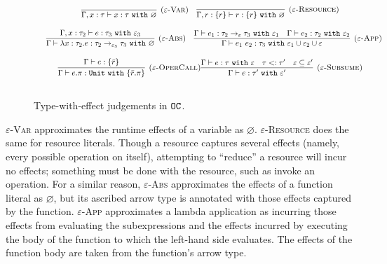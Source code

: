 \begin{figure}[h]

\noindent
{}

\[
\begin{array}{c}

\infer[\textsc{($\varepsilon$-Var)}]
	{ \Gamma, x:\tau \vdash x: \tau~\kw{with} \varnothing }
	{}
	
	~~~
	
\infer[\textsc{($\varepsilon$-Resource)}]
 	{ \Gamma, r: \{ r \} \vdash r : \{ r \}~\kw{with} \varnothing }
 	{} \\[3ex]
 	
 	~~~
	\infer[\textsc{($\varepsilon$-Abs)}]
	{ \Gamma \vdash \lambda x:\tau_2 . e : \tau_2 \rightarrow_{\varepsilon_3} \tau_3~\kw{with} \varnothing }
	{ \Gamma, x: \tau_2 \vdash e: \tau_3~\kw{with} \varepsilon_3 }
	
	~~~
	
\infer[\textsc{($\varepsilon$-App)}]
	{ \Gamma \vdash e_1~e_2 : \tau_3~\kw{with} \varepsilon_1 \cup \varepsilon_2 \cup \varepsilon  }
	{ \Gamma \vdash e_1: \tau_2 \rightarrow_{\varepsilon} \tau_3~\kw{with} \varepsilon_1 & \Gamma \vdash e_2: \tau_2~\kw{with} \varepsilon_2 } \\[3ex]
	
\infer[\textsc{($\varepsilon$-OperCall)}]
	{ \Gamma \vdash e.\pi: \kw{Unit} \kw{with} \{ \bar r.\pi \} }
	{ \Gamma \vdash e: \{ \bar r \}}

\infer[\textsc{($\varepsilon$-Subsume)}]
	{ \Gamma \vdash e: \tau' ~\kw{with} \varepsilon'}
	{ \Gamma \vdash e: \tau ~\kw{with} \varepsilon & \tau <: \tau' & \varepsilon \subseteq \varepsilon'}\\[3ex]
	
\end{array}
\]


\vspace{-7pt}
\caption{Type-with-effect judgements in $\mathtt{OC}$.}
\label{fig:opercalc_static_rules}
\end{figure}



\textsc{$\varepsilon$-Var} approximates the runtime effects of a variable as $\varnothing$. \textsc{$\varepsilon$-Resource} does the same for resource literals. Though a resource captures several effects (namely, every possible operation on itself), attempting to ``reduce'' a resource will incur no effects; something must be done with the resource, such as invoke an operation. For a similar reason, \textsc{$\varepsilon$-Abs} approximates the effects of a function literal as $\varnothing$, but its ascribed arrow type is annotated with those effects captured by the function. \textsc{$\varepsilon$-App} approximates a lambda application as incurring those effects from evaluating the subexpressions and the effects incurred by executing the body of the function to which the left-hand side evaluates. The effects of the function body are taken from the function's arrow type.


